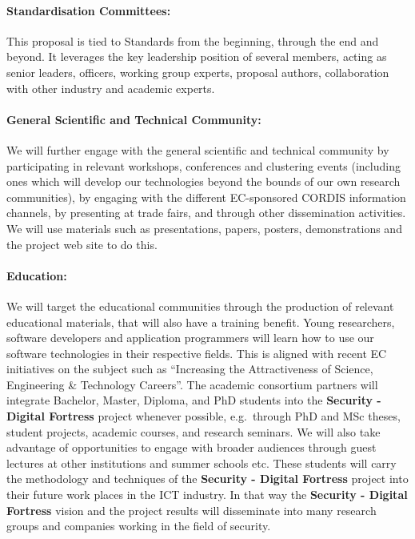 \documentclass[a4paper,11pt]{article}
\newcommand{\project}[1]{\textbf{#1}\xspace}
\newcommand{\SECURITY}{\project{Security - Digital Fortress}}
\newcommand{\TheProject}{\SECURITY}
\begin{document}
\paragraph{Standardisation Committees:}
This proposal is tied to Standards from the beginning, through the end and beyond. It leverages the key leadership position of several members, acting as senior leaders, officers, working group experts, proposal authors, collaboration with other industry and academic experts.
%
%

\paragraph{General Scientific and Technical Community:}
We will further engage with the general scientific and technical community
 by participating in relevant workshops, conferences and clustering events (including ones which
 will develop our technologies beyond the bounds of our own research communities), by engaging with the
 different EC-sponsored CORDIS information channels, by presenting at trade
 fairs, and through other dissemination activities.  We will use materials such as presentations,
 papers,  posters, demonstrations and the project web site to do this.


\paragraph{Education:} We will target 
the educational communities through the production of relevant educational materials, that will
also have a training benefit. Young researchers, software
 developers and application programmers will learn how to
 use our software technologies in their
 respective fields. This is aligned with recent EC
 initiatives on the subject such as ``Increasing the Attractiveness
 of Science, Engineering \& Technology Careers''.
 The academic consortium partners will integrate Bachelor,
 Master, Diploma, and PhD students into the \TheProject{}
 project whenever possible, e.g.~through PhD and MSc theses, student
 projects, academic courses, and research seminars. 
 We will also take advantage of opportunities to engage with broader
 audiences through guest lectures at other institutions and summer schools etc.
 These students will
 carry the methodology and techniques of the \TheProject{}
 project into their future work places in the ICT industry.
 In that way the \TheProject{} vision and the project
 results will disseminate into many research groups and
 companies working in the field of security. 
\end{document}
